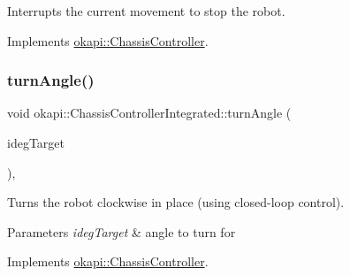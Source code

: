 Interrupts the current movement to stop the robot. 

Implements \mbox{\hyperlink{classokapi_1_1ChassisController_ac67edbbbe1c8480c4503b9875a3719cd}{okapi\+::\+Chassis\+Controller}}.

\mbox{\label{classokapi_1_1ChassisControllerIntegrated_a3c2ae782167fd9c6b27d637563e3a066}} 
\subsubsection{\texorpdfstring{turnAngle()}{turnAngle()}\hspace{0.1cm}{\footnotesize\ttfamily [1/2]}}
{\footnotesize\ttfamily void okapi\+::\+Chassis\+Controller\+Integrated\+::turn\+Angle (\begin{DoxyParamCaption}\item[{Q\+Angle}]{ideg\+Target }\end{DoxyParamCaption})\hspace{0.3cm}{\ttfamily [override]}, {\ttfamily [virtual]}}

Turns the robot clockwise in place (using closed-\/loop control).


\begin{DoxyCode}{0}
\DoxyCodeLine{\textcolor{comment}{// Turn 90 degrees clockwise}}
\end{DoxyCode}



\begin{DoxyParams}{Parameters}
{\em ideg\+Target} & angle to turn for \\
\hline
\end{DoxyParams}


Implements \mbox{\hyperlink{classokapi_1_1ChassisController_aab12308b3fad6793c007d7a33730a3f7}{okapi\+::\+Chassis\+Controller}}.

\mbox{\label{classokapi_1_1ChassisControllerIntegrated_a3f13749508bf420468ffdb54f62a9da2}} 
